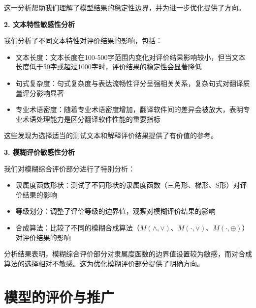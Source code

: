 \documentclass[bwprint]{cumcmthesis}
\begin{document}
这一分析帮助我们理解了模型结果的稳定性边界，并为进一步优化提供了方向。

\textbf{2. 文本特性敏感性分析}

我们分析了不同文本特性对评价结果的影响，包括：
\begin{itemize}
    \item 文本长度：文本长度在100-500字范围内变化对评价结果影响较小，但当文本长度低于50字或超过1000字时，评价结果的稳定性会显著降低
    \item 句式复杂度：句式复杂度与表达流畅性评分呈强相关关系，复杂句式对翻译质量评分影响显著
    \item 专业术语密度：随着专业术语密度增加，翻译软件间的差异会被放大，表明专业术语处理能力是区分翻译软件性能的重要指标
\end{itemize}

这些发现为选择适当的测试文本和解释评价结果提供了有价值的参考。

\textbf{3. 模糊评价敏感性分析}

我们对模糊综合评价部分进行了特别分析：
\begin{itemize}
    \item 隶属度函数形状：测试了不同形状的隶属度函数（三角形、梯形、S形）对评价结果的影响
    \item 等级划分：调整了评价等级的边界值，观察对模糊评价结果的影响
 \item 合成算法：比较了不同的模糊合成算法（$M(\wedge, \vee)$、$M(\cdot, \vee)$、$M(\cdot, \oplus)$）对评价结果的影响
\end{itemize}

分析结果表明，模糊综合评价部分对隶属度函数的边界值设置较为敏感，而对合成算法的选择相对不敏感。这为优化模糊评价部分提供了明确方向。


\section{模型的评价与推广}
\end{document}
